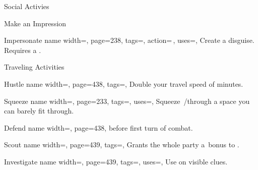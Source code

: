 \begin{PageFront}
\begin{Tables}{\frontTableHeight}
\begin{Table}{Social Activies}
\begin{entry}{Make an Impression}
            \end{entry}
            \begin{entry}{Impersonate}{%
                name width=\activityLength,%
                page=238,
                tags=\Concentrate\Manipulate,
                action=\,,
                uses={\Deception[tags={S}]},
            }
                Create a disguise. Requires a . \hfill
            \end{entry}
        \end{Table}
        \TableSpace
        \begin{Table}{Traveling Activities}
            \begin{entry}{Hustle}{%
                name width=\activityLength,%
                page=438,
                tags=\Move,
            }
                Double your travel speed of  minutes.\quad
            \end{entry}
            \begin{entry}{Squeeze}{%
                name width=\activityLength,%
                page=233,
                tags=\Move,
                uses={\Acrobatics[tags=T]},
            }
                Squeeze \,\Feet/\Min through a space you can barely fit through. \hfill
            \end{entry}
            \begin{entry}{Defend}{%
                name width=\activityLength,%
                page=438,
            }
                 before first turn of combat.\hfill
            \end{entry}
            \begin{entry}{Scout}{%
                name width=\activityLength,%
                page=439,
                tags=\Concentrate,
            }
                Grants the whole party a \,\Cirm bonus to .
            \end{entry}
            \breakLine
            \begin{entry}{Investigate}{%
                name width=\activityLength,%
                page=439,
                tags=\Concentrate,
                uses={\VariousKnowledge[tags=S]},
            }
                Use  on visible clues.\hfill

\end{entry}
\end{Table}
\end{Tables}
\end{PageFront}
